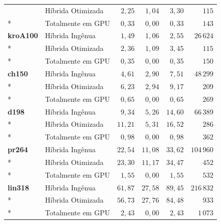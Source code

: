 \begin{tabeladensa}
\begin{longtable}[]{@{}llrrrr@{}}
                    & Híbrida Otimizada & \(2{,}25\)      & \(1{,}04\)   & \(3{,}30\)      & \(115\)         \\*
                    & Totalmente em GPU & \(0{,}33\)      & \(0{,}00\)   & \(0{,}33\)      & \(143\)         \\
  \midrule
  \textbf{kroA100}  & Híbrida Ingênua   & \(1{,}49\)      & \(1{,}06\)   & \(2{,}55\)      & \(26\,624\)     \\*
                    & Híbrida Otimizada & \(2{,}36\)      & \(1{,}09\)   & \(3{,}45\)      & \(115\)         \\*
                    & Totalmente em GPU & \(0{,}35\)      & \(0{,}00\)   & \(0{,}35\)      & \(150\)         \\
  \midrule
  \textbf{ch150}    & Híbrida Ingênua   & \(4{,}61\)      & \(2{,}90\)   & \(7{,}51\)      & \(48\,299\)     \\*
                    & Híbrida Otimizada & \(6{,}23\)      & \(2{,}94\)   & \(9{,}17\)      & \(209\)         \\*
                    & Totalmente em GPU & \(0{,}65\)      & \(0{,}00\)   & \(0{,}65\)      & \(269\)         \\
  \midrule
  \textbf{d198}     & Híbrida Ingênua   & \(9{,}34\)      & \(5{,}26\)   & \(14{,}60\)     & \(66\,389\)     \\*
                    & Híbrida Otimizada & \(11{,}21\)     & \(5{,}31\)   & \(16{,}52\)     & \(286\)         \\*
                    & Totalmente em GPU & \(0{,}98\)      & \(0{,}00\)   & \(0{,}98\)      & \(362\)         \\
  \midrule
  \textbf{pr264}    & Híbrida Ingênua   & \(22{,}54\)     & \(11{,}08\)  & \(33{,}62\)     & \(104\,960\)    \\*
                    & Híbrida Otimizada & \(23{,}30\)     & \(11{,}17\)  & \(34{,}47\)     & \(452\)         \\*
                    & Totalmente em GPU & \(1{,}55\)      & \(0{,}00\)   & \(1{,}55\)      & \(532\)         \\
  \midrule
  \textbf{lin318}   & Híbrida Ingênua   & \(61{,}87\)     & \(27{,}58\)  & \(89{,}45\)     & \(216\,832\)    \\*
                    & Híbrida Otimizada & \(56{,}73\)     & \(27{,}76\)  & \(84{,}48\)     & \(933\)         \\*
                    & Totalmente em GPU & \(2{,}43\)      & \(0{,}00\)   & \(2{,}43\)      & \(1\,073\)      \\

\end{longtable}
\end{tabeladensa}
